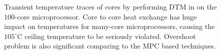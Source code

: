 \begin{figure}
  \centering
  \caption{Transient temperature traces of cores by performing DTM in
    \cite{Hanumaiah:TCAD'11} on the $100$-core
    microprocessor. Core to core heat exchange has huge impact on
    temperatures for many-core microprocessors, causing the
    $105^{\circ}$C ceiling temperature to be seriously violated. Overshoot
    problem is also significant comparing to the MPC based techniques.}\label{fig:magma}
\end{figure}






























